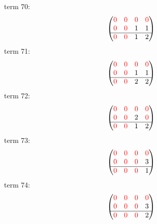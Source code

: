 \documentclass{article}
\begin{document}
term 70:
$$\begin{pmatrix}{\color{red} 0} & {\color{red} 0} & {\color{red} 0} & {\color{red} 0}\\
{\color{red} 0} & {\color{red} 0} & 1 & 1\\
\hline{\color{red} 0} & {\color{red} 0} & 1 & 2\\
\end{pmatrix}$$
term 71:
$$\begin{pmatrix}{\color{red} 0} & {\color{red} 0} & {\color{red} 0} & {\color{red} 0}\\
{\color{red} 0} & {\color{red} 0} & 1 & 1\\
\hline{\color{red} 0} & {\color{red} 0} & 2 & 2\\
\end{pmatrix}$$
term 72:
$$\begin{pmatrix}{\color{red} 0} & {\color{red} 0} & {\color{red} 0} & {\color{red} 0}\\
{\color{red} 0} & {\color{red} 0} & 2 & {\color{red} 0}\\
\hline{\color{red} 0} & {\color{red} 0} & 1 & 2\\
\end{pmatrix}$$
term 73:
$$\begin{pmatrix}{\color{red} 0} & {\color{red} 0} & {\color{red} 0} & {\color{red} 0}\\
{\color{red} 0} & {\color{red} 0} & {\color{red} 0} & 3\\
\hline{\color{red} 0} & {\color{red} 0} & {\color{red} 0} & 1\\
\end{pmatrix}$$
term 74:
$$\begin{pmatrix}{\color{red} 0} & {\color{red} 0} & {\color{red} 0} & {\color{red} 0}\\
{\color{red} 0} & {\color{red} 0} & {\color{red} 0} & 3\\
\hline{\color{red} 0} & {\color{red} 0} & {\color{red} 0} & 2\\
\end{pmatrix}$$
\end{document}

